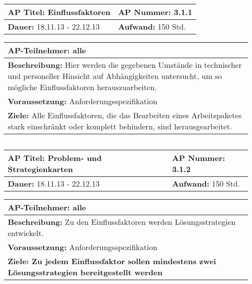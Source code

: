 \begin{tabular}{|p{7.43cm}|p{7.43cm}|}
\hline
\textbf{AP Titel: }Einflussfaktoren & \textbf{AP Nummer: }3.1.1\\ 
\hline
\textbf{Dauer: }18.11.13 - 22.12.13& \textbf{Aufwand: }150 Std.\\
\hline
\end{tabular}
\begin{tabular}{|p{15.3cm}|}
\hline
\textbf{AP-Teilnehmer: }alle\\
\hline
\textbf{Beschreibung: }Hier werden die gegebenen Umstände in technischer und personeller Hinsicht auf Abhängigkeiten untersucht, um so mögliche Einflussfaktoren herauszuarbeiten.\\
\hline
\textbf{Voraussetzung: }Anforderungsspezifikation\\
\hline 
\textbf{Ziele: }Alle Einflussfaktoren, die das Bearbeiten eines Arbeitspaketes stark einschränkt oder komplett behindern, sind herausgearbeitet.  \\
\hline 
\end{tabular}
\begin{verbatim}

\end{verbatim}

\begin{tabular}{|p{7.43cm}|p{7.43cm}|}
\hline
\textbf{AP Titel: }Problem- und Strategienkarten & \textbf{AP Nummer: }3.1.2\\ 
\hline
\textbf{Dauer: }18.11.13 - 22.12.13& \textbf{Aufwand: }150 Std.\\
\hline
\end{tabular}
\begin{tabular}{|p{15.3cm}|}
\hline
\textbf{AP-Teilnehmer: }alle\\
\hline
\textbf{Beschreibung: }Zu den Einflussfaktoren werden Lösungsstrategien entwickelt. \\
\hline
\textbf{Voraussetzung: }Anforderungsspezifikation\\
\hline 
\textbf{Ziele: Zu jedem Einflussfaktor sollen mindestens zwei Lösungsstrategien bereitgestellt werden}\\
\hline 
\end{tabular}
\begin{verbatim}

\end{verbatim}

